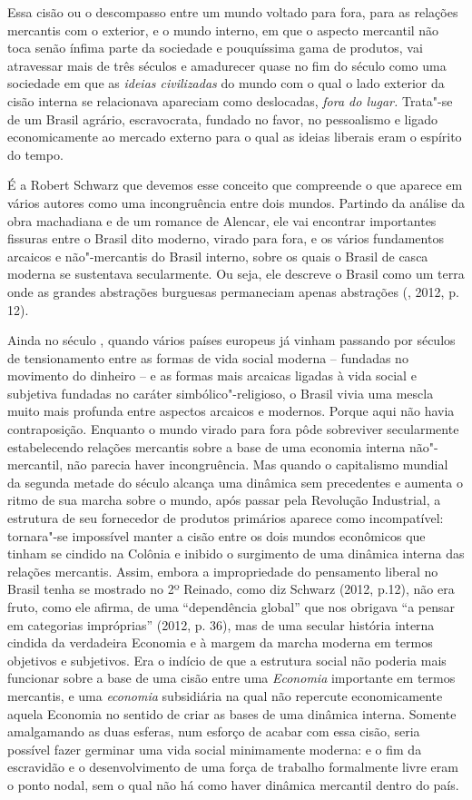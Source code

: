 Essa cisão ou o descompasso entre um mundo voltado para fora, para as
relações mercantis com o exterior, e o mundo interno, em que o aspecto
mercantil não toca senão ínfima parte da sociedade e pouquíssima gama de
produtos, vai atravessar mais de três séculos e amadurecer quase no fim
do século  como uma sociedade em que as \emph{ideias civilizadas} do
mundo com o qual o lado exterior da cisão interna se relacionava
apareciam como deslocadas, \emph{fora do lugar.} Trata"-se de um Brasil
agrário, escravocrata, fundado no favor, no pessoalismo e ligado
economicamente ao mercado externo para o qual as ideias liberais eram o
espírito do tempo.

É a Robert Schwarz que devemos esse conceito que compreende o que
aparece em vários autores como uma incongruência entre dois mundos.
Partindo da análise da obra machadiana e de um romance de Alencar, ele
vai encontrar importantes fissuras entre o Brasil dito moderno, virado
para fora, e os vários fundamentos arcaicos e não"-mercantis do Brasil
interno, sobre os quais o Brasil de casca moderna se sustentava
secularmente. Ou seja, ele descreve o Brasil como um terra onde as
grandes abstrações burguesas permaneciam apenas abstrações (,
2012, p. 12).

Ainda no século , quando vários países europeus já vinham passando
por séculos de tensionamento entre as formas de vida social moderna --
fundadas no movimento do dinheiro -- e as formas mais arcaicas ligadas à
vida social e subjetiva fundadas no caráter simbólico"-religioso, o
Brasil vivia uma mescla muito mais profunda entre aspectos arcaicos e
modernos. Porque aqui não havia contraposição. Enquanto o mundo virado
para fora pôde sobreviver secularmente estabelecendo relações mercantis
sobre a base de uma economia interna não"-mercantil, não parecia haver
incongruência. Mas quando o capitalismo mundial da segunda metade do
século  alcança uma dinâmica sem precedentes e aumenta o ritmo de sua
marcha sobre o mundo, após passar pela Revolução Industrial, a estrutura
de seu fornecedor de produtos primários aparece como incompatível:
tornara"-se impossível manter a cisão entre os dois mundos econômicos que
tinham se cindido na Colônia e inibido o surgimento de uma dinâmica
interna das relações mercantis. Assim, embora a impropriedade do
pensamento liberal no Brasil tenha se mostrado no 2º Reinado, como diz
Schwarz (2012, p.12), não era fruto, como ele afirma, de uma
``dependência global'' que nos obrigava ``a pensar em categorias
impróprias'' (2012, p. 36), mas de uma secular história interna cindida
da verdadeira Economia e à margem da marcha moderna em termos objetivos
e subjetivos. Era o indício de que a estrutura social não poderia mais
funcionar sobre a base de uma cisão entre uma \emph{Economia} importante
em termos mercantis, e uma \emph{economia} subsidiária na qual não
repercute economicamente aquela Economia no sentido de criar as bases de
uma dinâmica interna. Somente amalgamando as duas esferas, num esforço
de acabar com essa cisão, seria possível fazer germinar uma vida social
minimamente moderna: e o fim da escravidão e o desenvolvimento de uma
força de trabalho formalmente livre eram o ponto nodal, sem o qual não
há como haver dinâmica mercantil dentro do país.

